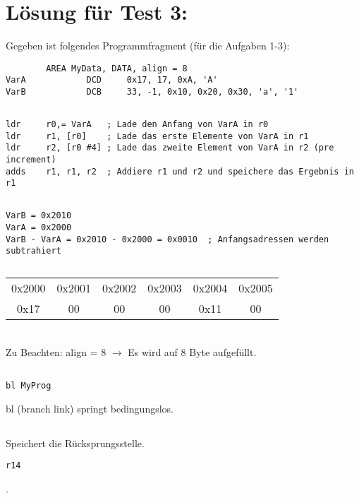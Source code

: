 
\section{Lösung für Test 3:}
Gegeben ist folgendes Programmfragment (für die Aufgaben 1-3):
\begin{lstlisting}
		AREA MyData, DATA, align = 8
VarA			DCD		0x17, 17, 0xA, 'A'
VarB			DCB		33, -1, 0x10, 0x20, 0x30, 'a', '1'
\end{lstlisting}
\subsection{}
\begin{lstlisting}
ldr 	r0,= VarA	; Lade den Anfang von VarA in r0
ldr 	r1, [r0]	; Lade das erste Elemente von VarA in r1
ldr 	r2, [r0 #4]	; Lade das zweite Element von VarA in r2 (pre increment)
adds	r1, r1, r2	; Addiere r1 und r2 und speichere das Ergebnis in r1
\end{lstlisting}

\subsection{}
\begin{lstlisting}
VarB = 0x2010
VarA = 0x2000
VarB - VarA = 0x2010 - 0x2000 = 0x0010	; Anfangsadressen werden subtrahiert
\end{lstlisting}

\subsection{}
  \begin{tabular}{ | c | c | c | c | c | c |}
    0x2000 & 0x2001  & 0x2002 & 0x2003 & 0x2004 & 0x2005 \\
    0x17 & 00  & 00 & 00 & 0x11 & 00 \\
  \end{tabular}\\
Zu Beachten: align = 8 $\rightarrow$ Es wird auf 8 Byte aufgefüllt.

\subsection{}
\begin{lstlisting}
bl MyProg
\end{lstlisting}
bl (branch link) springt bedingungslos.

\subsection{}
Speichert die Rücksprungsstelle.
\begin{lstlisting}
r14
\end{lstlisting}.
